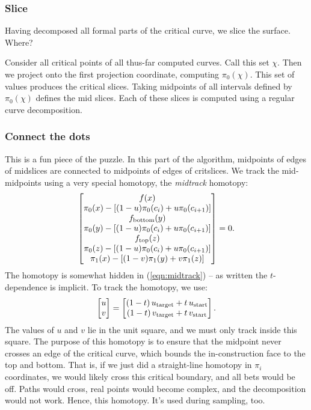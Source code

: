 \subsubsection{Slice}


Having decomposed all formal parts of the critical curve, we slice the surface.  Where?  

Consider all critical points of all thus-far computed curves.  Call this set $\chi$.  Then we project onto the first projection coordinate, computing $\pi_0(\chi)$.  This set of values produces the critical slices.  Taking midpoints of all intervals defined by $\pi_0(\chi)$ defines the mid slices.  Each of these slices is computed using a regular curve decomposition.





\subsubsection{Connect the dots}
\label{sec:connect_surface}

This is a fun piece of the puzzle.  In this part of the algorithm, midpoints of edges of midslices are connected to midpoints of edges of critslices.  We track the mid-midpoints using a very special homotopy, the {\em midtrack} homotopy:
\begin{equation}
\begin{bmatrix}
f(x) \\
\pi_0(x) - [(1-u) \pi_{0}(c_i) + u \pi_{0}(c_{i+1})] \\
f_{\textnormal{bottom}}(y) \\
\pi_0(y) - [(1-u) \pi_{0}(c_i) + u \pi_{0}(c_{i+1})] \\
f_{\textnormal{top}}(z) \\
\pi_0(z) - [(1-u) \pi_{0}(c_i) + u \pi_{0}(c_{i+1})] \\
\pi_1(x) - [(1-v)\pi_1(y) + v \pi_1(z)]
\end{bmatrix} = 0. \label{eqn:midtrack}
\end{equation}
%
The homotopy is somewhat hidden in (\ref{eqn:midtrack}) -- as written the $t$-dependence is implicit.  To track the homotopy, we use:
\begin{equation}
\begin{bmatrix}
u \\ v \end{bmatrix}
=
\begin{bmatrix}
(1-t) \,u_{\textnormal{target}} + t \, u_{\textnormal{start}} \\
(1-t) \, v_{\textnormal{target}} + t \, v_{\textnormal{start}}
\end{bmatrix}.
\end{equation}
The values of $u$ and $v$ lie in the unit square, and we must only track inside this square.  The purpose of this homotopy is to ensure that the midpoint never crosses an edge of the critical curve, which bounds the in-construction face to the top and bottom.  That is, if we just did a straight-line homotopy in $\pi_i$ coordinates, we would likely cross this critical boundary, and all bets would be off.  Paths would cross, real points would become complex, and the decomposition would not work.  Hence, this homotopy.  It's used during sampling, too.

